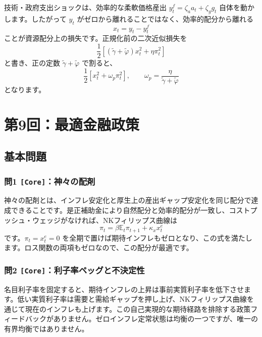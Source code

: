 \documentclass[
  japanese,
  lualatex,
  ja=standard,
  11pt,
  a4paper]{ltjsarticle}
\begin{document}
技術・政府支出ショックは、効率的な柔軟価格産出
\(y_t^f=\zeta_aa_t+\zeta_gg_t\) 自体を動かします。したがって \(y_t\)
がゼロから離れることではなく、効率的配分から離れる \[
x_t=y_t-y_t^f
\] ことが資源配分上の損失です。正規化前の二次近似損失を \[
\frac12\left[(\widetilde\gamma+\widetilde\varphi)x_t^2
+\eta\pi_t^2\right]
\] と書き、正の定数 \(\widetilde\gamma+\widetilde\varphi\) で割ると、 \[
\frac12\left[x_t^2+\omega_p\pi_t^2\right],
\qquad
\omega_p=\frac{\eta}{\widetilde\gamma+\widetilde\varphi}
\] となります。

\clearpage

\section{第9回：最適金融政策}\label{ux7b2c9ux56deux6700ux9069ux91d1ux878dux653fux7b56}

\subsection{基本問題}\label{ux57faux672cux554fux984c-8}

\subsubsection{\texorpdfstring{問1
\texttt{{[}Core{]}}：神々の配剤}{問1 {[}Core{]}：神々の配剤}}\label{ux554f1-coreux795eux3005ux306eux914dux5264}

神々の配剤とは、インフレ安定化と厚生上の産出ギャップ安定化を同じ配分で達成できることです。是正補助金により自然配分と効率的配分が一致し、コストプッシュ・ウェッジがなければ、NKフィリップス曲線は
\[
\pi_t=\beta\mathbb E_t\pi_{t+1}+\kappa_xx_t^e
\] です。\(\pi_t=x_t^e=0\)
を全期で置けば期待インフレもゼロとなり、この式を満たします。ロス関数の両項もゼロなので、この配分が最適です。

\subsubsection{\texorpdfstring{問2
\texttt{{[}Core{]}}：利子率ペッグと不決定性}{問2 {[}Core{]}：利子率ペッグと不決定性}}\label{ux554f2-coreux5229ux5b50ux7387ux30daux30c3ux30b0ux3068ux4e0dux6c7aux5b9aux6027}

名目利子率を固定すると、期待インフレの上昇は事前実質利子率を低下させます。低い実質利子率は需要と需給ギャップを押し上げ、NKフィリップス曲線を通じて現在のインフレも上げます。この自己実現的な期待経路を排除する政策フィードバックがありません。ゼロインフレ定常状態は均衡の一つですが、唯一の有界均衡ではありません。
\end{document}
